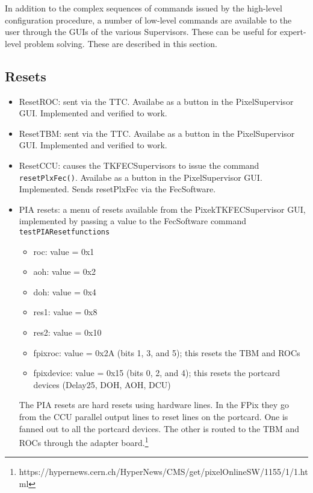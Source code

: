 
In addition to the complex sequences of commands issued by the
high-level configuration procedure, a number of low-level commands are
available to the user through the GUIs of the various
Supervisors. These can be useful for expert-level problem
solving. These are described in this section.

\subsection{Resets}

\begin{itemize}
\item ResetROC: sent via the TTC. Availabe as a button in the PixelSupervisor GUI. Implemented and verified to work.
\item ResetTBM: sent via the TTC. Availabe as a button in the PixelSupervisor GUI. Implemented and verified to work.
\item ResetCCU: causes the TKFECSupervisors to issue the command {\tt resetPlxFec()}. Availabe as a button in the PixelSupervisor GUI. Implemented. Sends resetPlxFec via the FecSoftware.
\item PIA resets: a menu of resets available from the PixekTKFECSupervisor GUI, implemented by passing a value to the FecSoftware command {\tt testPIAResetfunctions}
\begin{itemize}
\item roc: value = 0x1
\item aoh: value = 0x2
\item doh: value = 0x4
\item res1: value = 0x8
\item res2: value = 0x10
\item fpixroc: value = 0x2A (bits 1, 3, and 5); this resets the TBM and ROCs
\item fpixdevice: value = 0x15 (bits 0, 2, and 4); this resets the portcard devices (Delay25, DOH, AOH, DCU)
\end{itemize}
The PIA resets are hard resets using hardware lines. In the FPix they go from the CCU parallel output lines to reset lines on the portcard. One is fanned out to all the portcard devices. The other is routed to the TBM and ROCs through the adapter board.\footnote{https://hypernews.cern.ch/HyperNews/CMS/get/pixelOnlineSW/1155/1/1.html}
\end{itemize}

